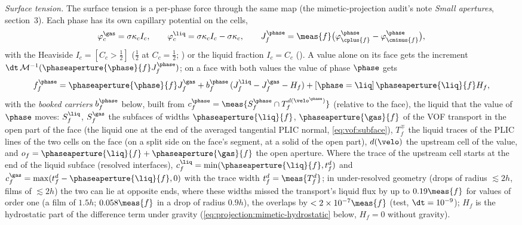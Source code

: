 \emph{Surface tension.} The surface tension is a per-phase force through the
same map (the mimetic-projection audit's note \emph{Small apertures},
section~3). Each phase has its own capillary potential on the cells,
\begin{equation}\label{eq:projection:mimetic-capillary}
  \varphi^{\gas}_c=\sigma\kappa_cI_c,\qquad
  \varphi^{\liq}_c=\sigma\kappa_cI_c-\sigma\kappa_c,\qquad
  J^{\phase}_f=\meas{f}\bigl(\varphi^{\phase}_{\cplus{f}}-\varphi^{\phase}_{\cminus{f}}\bigr),
\end{equation}
with the Heaviside $I_c=[C_c>\tfrac12]$ ($\tfrac12$ at $C_c=\tfrac12$;
) or the liquid fraction $I_c=C_c$ (). A
value alone on its face gets the increment
$\dt\,\mathcal M^{-1}(\phaseaperture{\phase}{f}J^{\phase}_f)$; on a face with
both values the value of phase $\phase$ gets
\begin{equation}\label{eq:projection:mimetic-booked}
  f^{\phase}_f=\phaseaperture{\phase}{f}J^{\gas}_f+b^{\phase}_f\,(J^{\liq}_f-J^{\gas}_f-H_f)+[\phase=\liq]\,\phaseaperture{\liq}{f}H_f,
\end{equation}
with the \emph{booked carriers} $b^{\phase}_f$ below, built from
$c^{\phase}_f=\meas{S^{\phase}_f\cap T^{d(\velo^{\phase})}_f}$ (relative to the
face), the liquid that the value of $\phase$ moves: $S^{\liq}_f$, $S^{\gas}_f$ the subfaces of widths
$\phaseaperture{\liq}{f}$, $\phaseaperture{\gas}{f}$ of the VOF transport in the
open part of the face (the liquid one at the end of the averaged tangential
PLIC normal, \cref{eq:vof:subface}), $T^{\mp}_f$ the liquid traces of the PLIC
lines of the two cells on the face (on a split side on the face's segment, at
a solid of the open part), $d(\velo)$ the upstream cell of the value, and
$o_f=\phaseaperture{\liq}{f}+\phaseaperture{\gas}{f}$ the open aperture. Where the trace of the
upstream cell starts at the end of the liquid subface (resolved interfaces),
$c^{\liq}_f=\min(\phaseaperture{\liq}{f},t^{d}_f)$ and
$c^{\gas}_f=\max(t^{d}_f-\phaseaperture{\liq}{f},0)$ with the trace width
$t^{d}_f=\meas{T^{d}_f}$; in under-resolved geometry (drops of radius
$\lesssim2h$, films of $\lesssim2h$) the two can lie at opposite ends, where
these widths missed the transport's liquid flux by up to $0.19\meas{f}$ for
values of order one (a film of $1.5h$; $0.058\meas{f}$ in a drop of radius
$0.9h$), the overlaps by $<2\times10^{-7}\meas{f}$ (test, $\dt=10^{-9}$);
$H_f$ is the hydrostatic part of the difference term under gravity
(\cref{eq:projection:mimetic-hydrostatic} below, $H_f=0$ without gravity).
